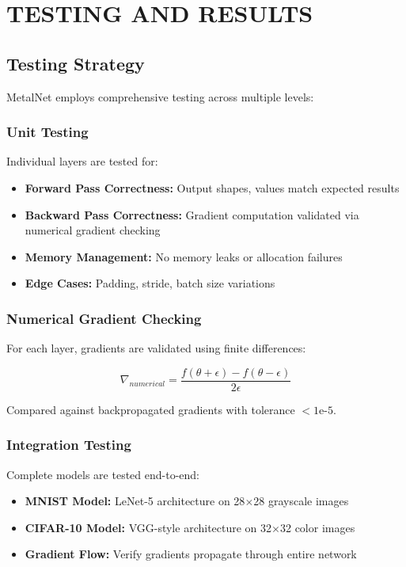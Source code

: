 \documentclass[12pt,oneside,a4paper]{report}
\begin{document}
\chapter{TESTING AND RESULTS}

\section{Testing Strategy}

MetalNet employs comprehensive testing across multiple levels:

\subsection{Unit Testing}

Individual layers are tested for:
\begin{itemize}
    \item \textbf{Forward Pass Correctness:} Output shapes, values match expected results
    \item \textbf{Backward Pass Correctness:} Gradient computation validated via numerical gradient checking
    \item \textbf{Memory Management:} No memory leaks or allocation failures
    \item \textbf{Edge Cases:} Padding, stride, batch size variations
\end{itemize}

\subsection{Numerical Gradient Checking}

For each layer, gradients are validated using finite differences:

$$\nabla_{numerical} = \frac{f(\theta + \epsilon) - f(\theta - \epsilon)}{2\epsilon}$$

Compared against backpropagated gradients with tolerance $< 1\text{e-5}$.

\subsection{Integration Testing}

Complete models are tested end-to-end:
\begin{itemize}
    \item \textbf{MNIST Model:} LeNet-5 architecture on 28$\times$28 grayscale images
    \item \textbf{CIFAR-10 Model:} VGG-style architecture on 32$\times$32 color images
    \item \textbf{Gradient Flow:} Verify gradients propagate through entire network
\end{itemize}
\end{document}
